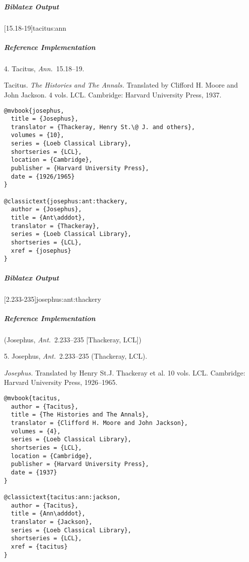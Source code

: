\documentclass[a4paper]{article}
\newenvironment{biboutput}{%
  \subparagraph{Biblatex Output}
}{\color{black}}
\newenvironment{refimp}{%
  \subparagraph{Reference Implementation}
  \color{reference-colour}
  \rm
}{\par\color{black}}
\begin{document}
\begin{biboutput}
  [15.18-19]{tacitus:ann}
\end{biboutput}

\begin{refimp}
  \hspace*{\bibindent}4. Tacitus, \emph{Ann.}\ 15.18–19.

  \hangindent\bibindent Tacitus. \emph{The Histories and The Annals.}
  Translated by Clifford H. Moore and John Jackson. 4 vols. LCL. Cambridge:
  Harvard University Press, 1937.

\end{refimp}

\medskip

\begin{lstlisting}
@mvbook{josephus,
  title = {Josephus},
  translator = {Thackeray, Henry St.\@ J. and others},
  volumes = {10},
  series = {Loeb Classical Library},
  shortseries = {LCL},
  location = {Cambridge},
  publisher = {Harvard University Press},
  date = {1926/1965}
}

@classictext{josephus:ant:thackery,
  author = {Josephus},
  title = {Ant\adddot},
  translator = {Thackeray},
  series = {Loeb Classical Library},
  shortseries = {LCL},
  xref = {josephus}
}
\end{lstlisting}

\begin{biboutput}
  [2.233-235]{josephus:ant:thackery}
\end{biboutput}

\begin{refimp}
  (Josephus, \emph{Ant.}\ 2.233–235 [Thackeray, LCL])

  \hspace*{\bibindent}5. Josephus, \emph{Ant.}\ 2.233–235 (Thackeray, LCL).

  \hangindent\bibindent \emph{Josephus.} Translated by Henry St.\@ J.
  Thackeray et al. 10 vols. LCL. Cambridge: Harvard University Press,
  1926–1965.

\end{refimp}

\medskip

\begin{lstlisting}
@mvbook{tacitus,
  author = {Tacitus},
  title = {The Histories and The Annals},
  translator = {Clifford H. Moore and John Jackson},
  volumes = {4},
  series = {Loeb Classical Library},
  shortseries = {LCL},
  location = {Cambridge},
  publisher = {Harvard University Press},
  date = {1937}
}

@classictext{tacitus:ann:jackson,
  author = {Tacitus},
  title = {Ann\adddot},
  translator = {Jackson},
  series = {Loeb Classical Library},
  shortseries = {LCL},
  xref = {tacitus}
}
\end{lstlisting}
\end{document}
